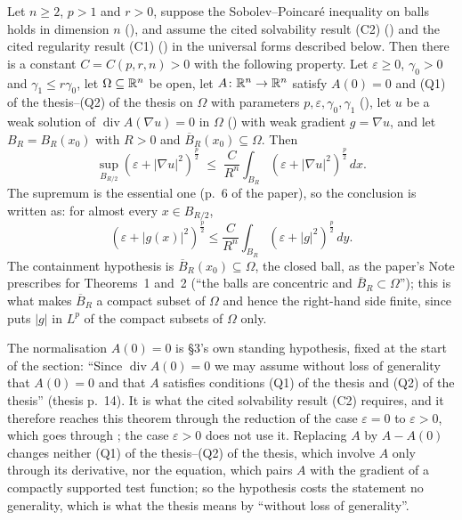\begin{theorem}[Theorem 1]
Let $n\ge2$, $p>1$ and $r>0$, suppose the Sobolev--Poincar\'e inequality on balls
holds in dimension $n$ (), and assume the cited
solvability result (C2) () and the cited regularity
result (C1) () in the universal forms described
below.  Then there is a constant $C=C(p,r,n)>0$ with the
following property.  Let $\varepsilon\ge0$, $\gamma_0>0$ and
$\gamma_1\le r\gamma_0$, let $\Omega\subseteq\mathbb{R}^n$ be open, let
$A\colon\mathbb{R}^n\to\mathbb{R}^n$ satisfy $A(0)=0$ and (Q1) of the thesis--(Q2) of the thesis on
$\Omega$ with parameters $p,\varepsilon,\gamma_0,\gamma_1$
(),
let $u$ be a weak solution of $\operatorname{div}A(\nabla u)=0$ in $\Omega$
() with weak gradient $g=\nabla u$, and let
$B_R=B_R(x_0)$ with $R>0$ and $\overline B_R(x_0)\subseteq\Omega$.  Then
\[
\sup_{B_{R/2}}(\varepsilon+|\nabla u|^2)^{\frac p2}
\;\le\;\frac{C}{R^n}\int_{B_R}(\varepsilon+|\nabla u|^2)^{\frac p2}\,dx .
\]
The supremum is the essential one (p.~6 of the paper), so the conclusion is
written as: for almost every $x\in B_{R/2}$,
\[
(\varepsilon+|g(x)|^2)^{\frac p2}
\le\frac{C}{R^n}\int_{B_R}(\varepsilon+|g|^2)^{\frac p2}\,dy .
\]
The containment hypothesis is $\overline B_R(x_0)\subseteq\Omega$, the closed
ball, as the paper's Note prescribes for Theorems~1 and~2 (``the balls are
concentric and $\overline B_R\subset\Omega$''); this is what makes
$\overline B_R$ a compact subset of $\Omega$ and hence the right-hand side
finite, since  puts $|g|$ in $L^p$ of the compact
subsets of $\Omega$ only.

The normalisation $A(0)=0$ is \S3's own standing hypothesis, fixed at the start
of the section: ``Since $\operatorname{div}A(0)=0$ we may assume without loss of
generality that $A(0)=0$ and that $A$ satisfies conditions (Q1) of the thesis and
(Q2) of the thesis'' (thesis p.~14).  It is what the cited solvability result (C2)
requires, and it therefore reaches this theorem through the reduction of the
case $\varepsilon=0$ to $\varepsilon>0$, which goes through
; the case $\varepsilon>0$ does not use it.
Replacing $A$ by $A-A(0)$ changes neither (Q1) of the thesis--(Q2) of the thesis, which
involve $A$ only through its derivative, nor the equation, which pairs $A$ with
the gradient of a compactly supported test function; so the hypothesis costs the
statement no generality, which is what the thesis means by ``without loss of
generality''.


\end{theorem}
